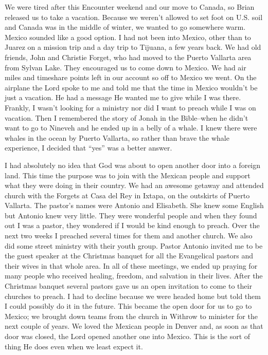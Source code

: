 \documentclass[oneside]{book}
\begin{document}
We were tired after this Encounter weekend and our move to Canada, so Brian released us to take a vacation. Because we weren’t allowed to set foot on U.S. soil and Canada was in the middle of winter, we wanted to go somewhere warm.  Mexico sounded like a good option. I had not been into Mexico, other than to Juarez on a mission trip and a day trip to Tijuana, a few years back. We had old friends, John and Christie Forget, who had moved to the Puerto Vallarta area from Sylvan Lake. They encouraged us to come down to Mexico. We had air miles and timeshare points left in our account so off to Mexico we went. On the airplane the Lord spoke to me and told me that the time in Mexico wouldn’t be just a vacation. He had a message He wanted me to give while I was there. Frankly, I wasn’t looking for a ministry nor did I want to preach while I was on vacation. Then I remembered the story of Jonah in the Bible--when he didn’t want to go to Nineveh and he ended up in a belly of a whale. I knew there were whales in the ocean by Puerto Vallarta, so rather than brave the whale experience, I decided that “yes” was a better answer.

I had absolutely no idea that God was about to open another door into a foreign land. This time the purpose was to join with the Mexican people and support what they were doing in their country. We had an awesome getaway and attended church with the Forgets at Casa del Rey in Ixtapa, on the outskirts of Puerto Vallarta. The pastor’s names were Antonio and Elisabeth. She knew some English but Antonio knew very little. They were wonderful people and when they found out I was a pastor, they wondered if I would be kind enough to preach. Over the next two weeks I preached several times for them and another church. We also did some street ministry with their youth group. Pastor Antonio invited me to be the guest speaker at the Christmas banquet for all the Evangelical pastors and their wives in that whole area. In all of these meetings, we ended up praying for many people who received healing, freedom, and salvation in their lives. After the Christmas banquet several pastors gave us an open invitation to come to their churches to preach. I had to decline because we were headed home but told them I could possibly do it in the future. This became the open door for us to go to Mexico; we brought down teams from the church in Withrow to minister for the next couple of years. We loved the Mexican people in Denver and, as soon as that door was closed, the Lord opened another one into Mexico. This is the sort of thing He does even when we least expect it. 
\end{document}
